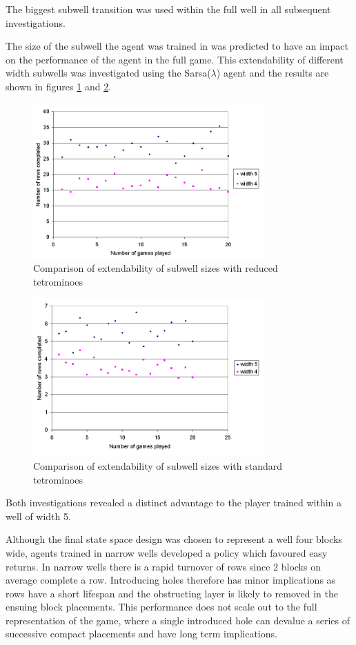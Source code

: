 \documentclass{rucsthesis}
\begin{document}
The biggest subwell transition was used within the full well in all subsequent investigations. 

The size of the subwell the agent was trained in was predicted to have an impact on the performance of the agent in the full game. This extendability of different width subwells was investigated using the Sarsa($\lambda$) agent and the results are shown in figures \ref{fig:widthcomparrison} and \ref{fig:widthcomparrisonfulltet}.

\begin{figure}[h]
\centering
\includegraphics[width=3.5in]{widthcomparrison.png}
\caption{Comparison of extendability of subwell sizes with reduced tetrominoes}
\label{fig:widthcomparrison}
\end{figure}

\begin{figure}[h]
\centering
\includegraphics[width=3.5in]{widthcomparrisonfulltet.png}
\caption{Comparison of extendability of subwell sizes with standard tetrominoes}
\label{fig:widthcomparrisonfulltet}
\end{figure}

Both investigations revealed a distinct advantage to the player trained within a well of width 5.

Although the final state space design was chosen to represent a well four blocks wide, agents trained in narrow wells developed a policy which favoured easy returns. In narrow wells there is a rapid turnover of rows since 2 blocks on average complete a row. Introducing holes therefore has minor implications as rows have a short lifespan and the obstructing layer is likely to removed in the ensuing block placements. This performance does not scale out to the full representation of the game, where a single introduced hole can devalue a series of successive compact placements and have long term implications.
\end{document}
